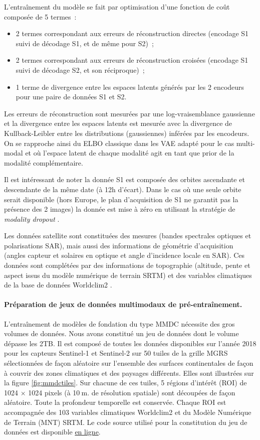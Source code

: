 L’entraînement du modèle se fait par optimisation d’une fonction de coût composée de 5 termes :
\begin{itemize}
\item 2 termes correspondant aux erreurs de réconstruction directes (encodage S1 suivi de décodage S1, et de même pour S2) ;
\item 2 termes correspondant aux erreurs de réconstruction croisées (encodage S1 suivi de décodage S2, et son réciproque) ;
\item 1 terme de divergence entre les espaces latents générés par les 2 encodeurs pour une paire de données S1 et S2.
\end{itemize}

Les erreurs de réconstruction sont mesurées par une log-vraisemblance gaussienne et la divergence entre les espaces latents est mesurée avec la divergence de Kullback-Leibler entre les distributions (gaussiennes) inférées par les encodeurs. On se rapproche ainsi du ELBO classique dans les VAE adapté pour le cas multi-modal et où l’espace latent de chaque modalité agit en tant que prior de la modalité complémentaire.

Il est intéressant de noter la donnée S1 est composée des orbites ascendante et descendante de la même date (à 12h d’écart). Dans le cas où une seule orbite serait disponible (hors Europe, le plan d’acquisition de S1 ne garantit pas la présence des 2 images) la donnée est mise à zéro en utilisant la stratégie de \textit{modality dropout} \cite{neverova-2016-moddr}.

Les données satellite sont constituées des mesures (bandes spectrales optiques et polarisations SAR), mais aussi des informations de géométrie d’acquisition (angles capteur et solaires en optique et angle d’incidence locale en SAR). Ces données sont complétées par des informations de topographie (altitude, pente et aspect issus du modèle numérique de terrain SRTM) et des variables climatiques de la base de données Worldclim2 \cite{fick17_world}.

\paragraph{Préparation de jeux de données multimodaux de pré-entraînement.}

L’entraînement de modèles de fondation du type MMDC nécessite des gros volumes de données. Nous avons constitué un jeu de données dont le volume dépasse les 2TB. Il est composé de toutes les données disponibles sur l’année 2018 pour les capteurs Sentinel-1 et Sentinel-2 sur 50 tuiles de la grille MGRS sélectionnées de façon aléatoire sur l’ensemble des surfaces continentales de façon à couvrir des zones climatiques et des paysages différents. Elles sont illustrées sur la figure \ref{fig:mmdctiles}. Sur chacune de ces tuiles, 5 régions d’intérêt (ROI) de 1024 $\times$ 1024 pixels (à 10$\:$m. de résolution spatiale) sont découpées de façon aléatoire. Toute la profondeur temporelle est conservée. Chaque ROI est accompagnée des 103 variables climatiques Worldclim2 et du Modèle Numérique de Terrain (MNT) SRTM. Le code source utilisé pour la constitution du jeu de données est disponible \href{https://src.koda.cnrs.fr/mmdc/mmdc-datacollection}{en ligne}.



